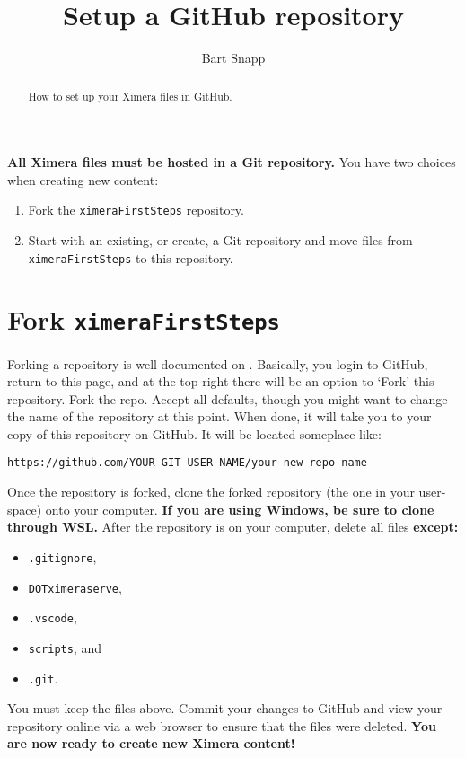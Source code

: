 \documentclass{ximera}
\title{Setup a GitHub repository}
\author{Bart Snapp}
\begin{document}
\begin{abstract}
  How to set up your Ximera files in GitHub.
\end{abstract}
\maketitle

\textbf{All Ximera files must be hosted in a Git repository.} You have two
choices when creating new content:
\begin{enumerate}
  \item Fork the \texttt{ximeraFirstSteps} repository.
  \item Start with an existing, or create, a Git repository and move files
        from \texttt{ximeraFirstSteps} to this repository.
\end{enumerate}

\section{Fork \texttt{ximeraFirstSteps}}

Forking a repository is well-documented on
.
Basically, you login to GitHub, return to this page, and at the top right there
will be an option to `Fork' this repository. Fork the repo. Accept all
defaults, though you might want to change the name of the repository at this
point. When done, it will take you to
your copy of this repository on GitHub. It will be located someplace like:
\begin{center}
  \texttt{https://github.com/YOUR-GIT-USER-NAME/your-new-repo-name}
\end{center}
Once the repository is forked, clone the forked repository (the one in your
user-space) onto your computer. \textbf{If you are using Windows, be sure to
  clone through WSL.}
After the repository is on your computer, delete all files \textbf{except:}
\begin{itemize}
  \item \verb|.gitignore|,
  \item \verb|DOTximeraserve|,
  \item \verb|.vscode|,
  \item \verb|scripts|, and
  \item \verb|.git|.
\end{itemize}
You must keep the files above.	Commit your changes to GitHub and view your
repository online via a web browser to ensure that the files were deleted.
\textbf{You are now ready to create new Ximera content!}
\end{document}
